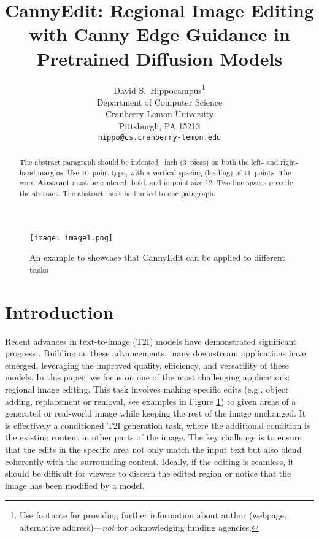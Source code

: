 \documentclass{article}
\title{CannyEdit: Regional Image Editing with Canny Edge Guidance in Pretrained Diffusion Models}
\author{%
  David S.~Hippocampus\thanks{Use footnote for providing further information
    about author (webpage, alternative address)---\emph{not} for acknowledging
    funding agencies.} \\
  Department of Computer Science\\
  Cranberry-Lemon University\\
  Pittsburgh, PA 15213 \\
  \texttt{hippo@cs.cranberry-lemon.edu} \\
}
\begin{document}
\maketitle


\begin{abstract}
  The abstract paragraph should be indented ~inch (3~picas) on
  both the left- and right-hand margins. Use 10~point type, with a vertical
  spacing (leading) of 11~points.  The word \textbf{Abstract} must be centered,
  bold, and in point size 12. Two line spaces precede the abstract. The abstract
  must be limited to one paragraph.
\end{abstract}


\begin{figure}[h!]
    \centering
    \texttt{[image: image1.png]}
    \caption{An example to showcase that CannyEdit can be applied to different tasks}
    \label{fig1}
\end{figure}


\section{Introduction}


Recent advances in text-to-image (T2I) models have demonstrated significant progress \citep{rombach2022high,betker2023improving,chen2023pixart,esser2024scaling,blackforest2024flux}. Building on these advancements, many downstream applications have emerged, leveraging the improved quality, efficiency, and versatility of these models.  In this paper, we focus on one of the most challenging applications: regional image editing. This task involves making specific edits (e.g., object adding, replacement or removal, see examples in Figure \ref{fig1}) to given areas of a generated or real-world image while keeping the rest of the image unchanged. It is effectively a conditioned T2I generation task, where the additional condition is the existing content in other parts of the image. The key challenge is to ensure that the edits in the specific area not only match the input text but also blend coherently with the surrounding content. Ideally, if the editing is seamless, it should be difficult for viewers to discern the edited region or notice that the image has been modified by a model. 
\end{document}
